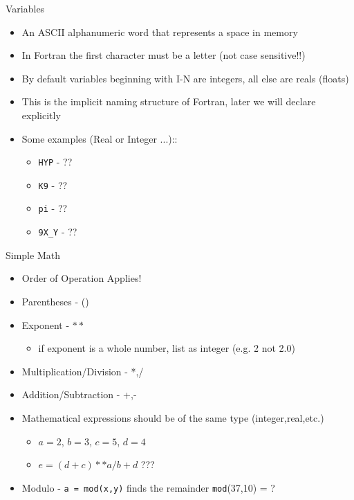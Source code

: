 \documentclass{beamer}
\begin{document}
\begin{frame}{Variables}
\begin{itemize}
  \item An ASCII alphanumeric word that represents a space in memory
  \item In Fortran the first character must be a letter (not case sensitive!!)
  \item By default variables beginning with I-N are integers, all else are reals (floats)
  \item This is the implicit naming structure of Fortran, later we will declare explicitly
  \item Some examples (Real or Integer ...)::
    \begin{itemize}
      \item \texttt{HYP} - ??
      \item \texttt{K9} - ??
      \item \texttt{pi} - ??
      \item \texttt{9X\_Y} - ??
    \end{itemize}
\end{itemize}
\end{frame}
\begin{frame}{Simple Math}
\begin{itemize}
  \item Order of Operation Applies!
  \vfill\item Parentheses - ()
  \item Exponent - $**$
   \vfill \begin{itemize}
      \item if exponent is a whole number, list as integer (e.g. 2 not 2.0)
    \end{itemize}
  \vfill\item Multiplication/Division - *,/
  \vfill\item Addition/Subtraction - +,-
  \vfill\item Mathematical expressions should be of the same type (integer,real,etc.)
    \begin{itemize}
      \item $a=2$, $b=3$, $c=5$, $d=4$
      \item $e = (d + c)**a/b + d$ ???
    \end{itemize}
  \vfill\item Modulo - \texttt{a = mod(x,y)} finds the remainder \texttt{mod}(37,10) = ?
\end{itemize}
\end{frame}
\end{document}
